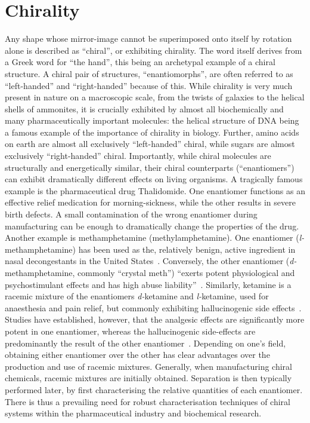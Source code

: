 \chapter{Chirality}\label{sec:background:Chirality}

Any shape whose mirror-image cannot be superimposed onto itself by rotation alone is described as ``chiral'', or exhibiting chirality. The word itself derives from a Greek word for ``the hand'', this being an archetypal example of a chiral structure. A chiral pair of structures, ``enantiomorphs'', are often referred to as ``left-handed'' and ``right-handed'' because of this. While chirality is very much present in nature on a macroscopic scale, from the twists of galaxies to the helical shells of ammonites, it is crucially exhibited by almost all biochemically and many pharmaceutically important molecules: the helical structure of DNA being a famous example of the importance of chirality in biology. Further, amino acids on earth are almost all exclusively ``left-handed'' chiral, while sugars are almost exclusively ``right-handed'' chiral. Importantly, while chiral molecules are structurally and energetically similar, their chiral counterparts (``enantiomers'') can exhibit dramatically different effects on living organisms. 
A tragically famous example is the pharmaceutical drug Thalidomide. One enantiomer functions as an effective relief medication for morning-sickness, while the other results in severe birth defects. A small contamination of the wrong enantiomer during manufacturing can be enough to dramatically change the properties of the drug. Another example is methamphetamine (methylamphetamine). One enantiomer (\textit{l-}methamphetamine) has been used as the, relatively benign, active ingredient in nasal decongestants in the United States~\cite{Mendelson2008}. Conversely, the other enantiomer (\textit{d-}methamphetamine, commonly ``crystal meth'') ``exerts potent physiological and psychostimulant effects and has high abuse liability''~\cite{Nishimura2017}. Similarly, ketamine is a racemic mixture of the enantiomers \textit{d-}ketamine and \textit{l-}ketamine, used for anaesthesia and pain relief, but commonly exhibiting hallucinogenic side effects~\cite{Craven2007}. Studies have established, however, that the analgesic effects are significantly more potent in one enantiomer, whereas the hallucinogenic side-effects are predominantly the result of the other enantiomer~\cite{Craven2007, Muller2016, Zeilhofer1992}. 
Depending on one's field, obtaining either enantiomer over the other has clear advantages over the production and use of racemic mixtures. Generally, when manufacturing chiral chemicals, racemic mixtures are initially obtained. Separation is then typically performed later, by first characterising the relative quantities of each enantiomer. There is thus a prevailing need for robust characterisation techniques of chiral systems within the pharmaceutical industry and biochemical research. 
